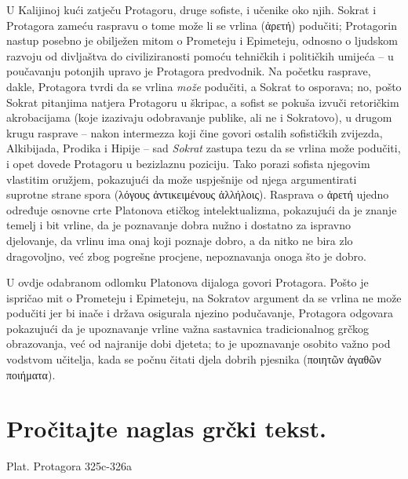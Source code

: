 U Kalijinoj kući zatječu Protagoru, druge sofiste, i učenike oko njih. Sokrat i Protagora zameću raspravu o tome može li se vrlina (\textgreek[variant=ancient]{ἀρετή}) podučiti; Protagorin nastup posebno je obilježen mitom o Prometeju i Epimeteju, odnosno o ljudskom razvoju od divljaštva do civiliziranosti pomoću tehničkih i političkih umijeća – u poučavanju potonjih upravo je Protagora predvodnik. Na početku rasprave, dakle, Protagora tvrdi da se vrlina \textit{može} podučiti, a Sokrat to osporava; no, pošto Sokrat pitanjima natjera Protagoru u škripac, a sofist se pokuša izvuči retoričkim akrobacijama (koje izazivaju odobravanje publike, ali ne i Sokratovo), u drugom krugu rasprave -- nakon intermezza koji čine govori ostalih sofističkih zvijezda, Alkibijada, Prodika i Hipije – sad \textit{Sokrat} zastupa tezu da se vrlina može podučiti, i opet dovede Protagoru u bezizlaznu poziciju. Tako porazi sofista njegovim vlastitim oružjem, pokazujući da može uspješnije od njega argumentirati suprotne strane spora (\textgreek[variant=ancient]{λόγους ἀντικειμένους ἀλλήλοις}). Rasprava o \textgreek[variant=ancient]{ἀρετή} ujedno određuje osnovne crte Platonova etičkog intelektualizma, pokazujući da je znanje temelj i bit vrline, da je poznavanje dobra nužno i dostatno za ispravno djelovanje, da vrlinu ima onaj koji poznaje dobro, a da nitko ne bira zlo dragovoljno, već zbog pogrešne procjene, nepoznavanja onoga što je dobro.

U ovdje odabranom odlomku Platonova dijaloga govori Protagora. Pošto je ispričao mit o Prometeju i Epimeteju, na Sokratov argument da se vrlina ne može podučiti jer bi inače i država osigurala njezino podučavanje, Protagora odgovara pokazujući da je upoznavanje vrline važna sastavnica tradicionalnog grčkog obrazovanja, već od najranije dobi djeteta; to je upoznavanje osobito važno pod vodstvom učitelja, kada se počnu čitati djela dobrih pjesnika (\textgreek[variant=ancient]{ποιητῶν ἀγαθῶν ποιήματα}).


\section*{Pročitajte naglas grčki tekst.}

Plat. Protagora 325c-326a


\medskip


